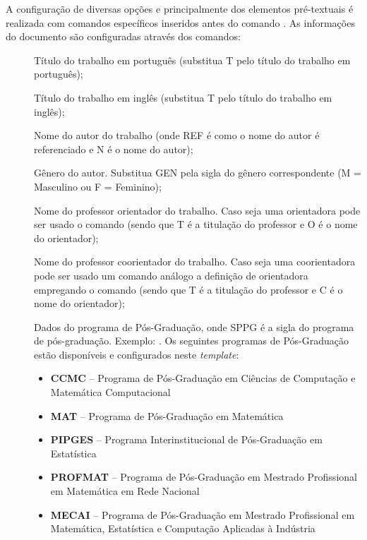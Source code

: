 A configuração de diversas opções e principalmente dos elementos pré-textuais é realizada com comandos específicos inseridos antes do comando . As informações do documento são configuradas através dos comandos:

\begin{description}

 \item[] Título do trabalho em português (substitua T pelo título do trabalho em português);
 
 \item[] Título do trabalho em inglês (substitua T pelo título do trabalho em inglês);

 \item[] Nome do autor do trabalho (onde REF é como o nome do autor é referenciado e N é o nome do autor);
 
  \item[] Gênero do autor. Substitua GEN pela sigla do gênero correspondente (M = Masculino ou F = Feminino);

 \item[] Nome do professor orientador do trabalho. Caso seja uma orientadora pode ser usado o comando  (sendo que T é a titulação do professor e O é o nome do orientador);

 \item[] Nome do professor coorientador do trabalho. Caso seja uma coorientadora pode ser usado um comando análogo a definição de orientadora  empregando o comando (sendo que T é a titulação do professor e C é o nome do orientador);

 
 \item[] Dados do programa de Pós-Graduação, onde SPPG é a sigla do programa de pós-graduação. Exemplo: . Os seguintes programas de Pós-Graduação estão disponíveis e configurados neste \textit{template}:
    \begin{itemize}
        \item \textbf{CCMC} -- Programa de Pós-Graduação em Ciências de Computação e Matemática Computacional
        \item \textbf{MAT} -- Programa de Pós-Graduação em Matemática
        \item \textbf{PIPGES} -- Programa Interinstitucional de Pós-Graduação em Estatística
        \item \textbf{PROFMAT} -- Programa de Pós-Graduação em Mestrado Profissional em Matemática em Rede Nacional
        \item \textbf{MECAI} -- Programa de Pós-Graduação em Mestrado Profissional em Matemática, Estatística e Computação Aplicadas à Indústria
    \end{itemize}
 

\end{description}
